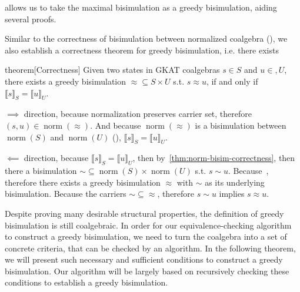 \documentclass[conference]{IEEEtran}
\DeclareMathOperator{\norm}{\mathrm{norm}}
\begin{document}
 allows us to take the maximal bisimulation as a greedy bisimulation, aiding several proofs.



Similar to the correctness of bisimulation between normalized coalgebra (), we also establish a correctness theorem for greedy bisimulation, i.e. there exists 

\begin{theoremEnd}{theorem}[Correctness]
    Given two states in GKAT coalgebras \(s ∈ S\) and \(u ∈ ,U\), there exists a greedy bisimulation \({≈} ⊆ S × U\) s.t. \(s ≈ u\), if and only if \(⟦s⟧_S = ⟦u⟧_U\).
\end{theoremEnd}

\begin{proofEnd}
    \(⟹\) direction, because normalization preserves carrier set, therefore \((s, u) ∈ \norm(≈)\).
    And because \(\norm(≈)\) is a bisimulation between \(\norm(S)\) and \(\norm(U)\) (), \(⟦s⟧_S = ⟦u⟧_U\).

    \(⟸\) direction, because \(⟦s⟧_S = ⟦u⟧_U\), then by~\cref{thm:norm-bisim-correctness}, then there a bisimulation \(∼ ⊆ \norm(S) × \norm(U)\) s.t. \(s ∼ u\). 
    Because~, therefore there exists a greedy bisimulation \(≈\) with \(∼\) as its underlying bisimulation. 
    Because the carriers \({∼} ⊆ {≈}\), therefore \(s ∼ u\) implies \(s ≈ u\).
\end{proofEnd}

Despite proving many desirable structural properties, the definition of greedy bisimulation is still coalgebraic.
In order for our equivalence-checking algorithm to construct a greedy bisimulation, we need to turn the coalgebra into a set of concrete criteria, that can be checked by an algorithm.
In the following theorem, we will present such necessary and sufficient conditions to construct a greedy bisimulation.
Our algorithm will be largely based on recursively checking these conditions to establish a greedy bisimulation.
\end{document}
